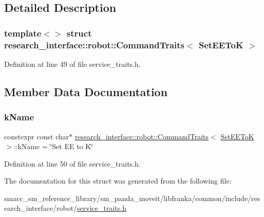 \subsection{Detailed Description}
\subsubsection*{template$<$$>$\newline
struct research\+\_\+interface\+::robot\+::\+Command\+Traits$<$ Set\+E\+E\+To\+K $>$}



Definition at line 49 of file service\+\_\+traits.\+h.



\subsection{Member Data Documentation}
\mbox{\label{structresearch__interface_1_1robot_1_1CommandTraits_3_01SetEEToK_01_4_a69b5a57cf82827f7f1ce0f0022aaed28}} 
\subsubsection{\texorpdfstring{k\+Name}{kName}}
{\footnotesize\ttfamily constexpr const char$\ast$ \hyperlink{structresearch__interface_1_1robot_1_1CommandTraits}{research\+\_\+interface\+::robot\+::\+Command\+Traits}$<$ \hyperlink{structresearch__interface_1_1robot_1_1SetEEToK}{Set\+E\+E\+ToK} $>$\+::k\+Name = \char`\"{}Set EE to K\char`\"{}\hspace{0.3cm}{\ttfamily [static]}}



Definition at line 50 of file service\+\_\+traits.\+h.



The documentation for this struct was generated from the following file\+:\begin{DoxyCompactItemize}
\item 
smacc\+\_\+sm\+\_\+reference\+\_\+library/sm\+\_\+panda\+\_\+moveit/libfranka/common/include/research\+\_\+interface/robot/\hyperlink{service__traits_8h}{service\+\_\+traits.\+h}\end{DoxyCompactItemize}
